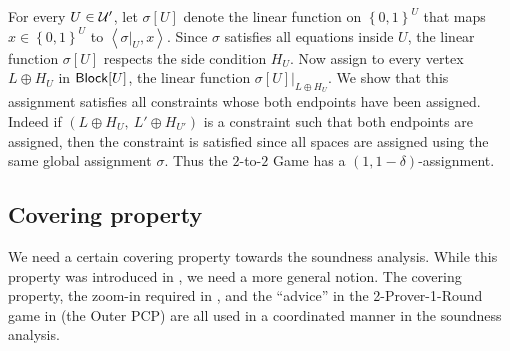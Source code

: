\documentclass{toc}
\newcommand\set[1]{{\left\{ #1 \right\}}}
\newcommand\power[1]{\set{0,1}^{#1}}
\newcommand*\xor{\mathbin{\oplus}}
\begin{document}
%
For every $U \in {\cal U}'$, let $\sigma[U]$ denote the linear function on $\power{U}$ that maps $x \in \power{U}$ to $\left< \sigma|_U, x \right>$.
Since $\sigma$ satisfies all equations inside $U$, the linear function $\sigma[U]$ respects the side condition $H_U$. Now assign to every vertex
$L\xor H_U$ in ${\sf Block}[U]$, the linear function $\sigma[U]|_{L\xor H_U}$. We show that this assignment satisfies all constraints whose
both endpoints have been assigned.
Indeed if $(L\xor H_U, ~L'\xor H_{U'})$ is a constraint such that both endpoints are assigned,
then the constraint  is satisfied since all spaces are assigned using the same global assignment $\sigma$. Thus the $2$-to-$2$ Game has a
$(1, 1-\delta)$-assignment.


\subsection{Covering property}\label{section:covering}

We need a certain covering property towards the soundness analysis. While this property was introduced in \cite{KS}, we need a more general notion.
The covering property, the zoom-in required in , and the ``advice'' in the 2-Prover-1-Round game in  (the Outer PCP) are all used in a coordinated  manner in the soundness analysis.
\end{document}
